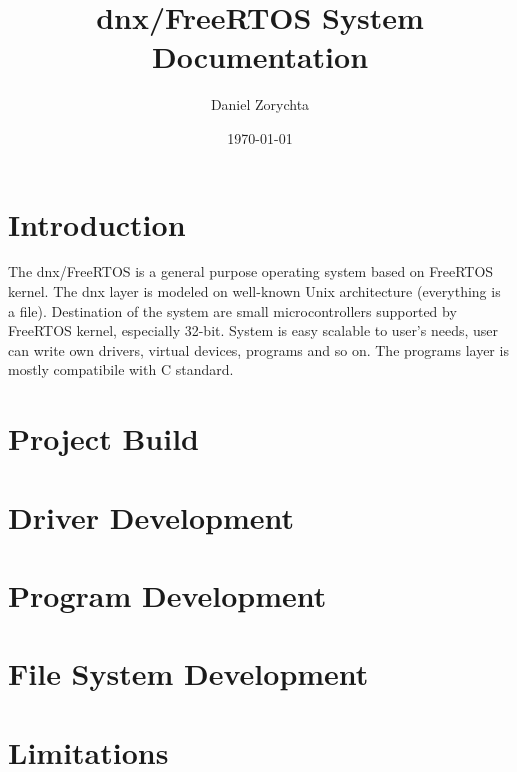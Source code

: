 \documentclass[a4paper,11pt]{article}
\title{dnx/FreeRTOS System Documentation}
\author{Daniel Zorychta}
\date{\today}
\begin{document}
\maketitle
\tableofcontents

\section{Introduction}
The dnx/FreeRTOS is a general purpose operating system based on FreeRTOS kernel.
The dnx layer is modeled on well-known Unix architecture (everything is a file).
Destination  of  the  system  are  small  microcontrollers supported by FreeRTOS
kernel,  especially  32-bit.  System  is easy scalable to user's needs, user can
write own drivers,  virtual devices,  programs and so on.  The programs layer is
mostly compatibile with C standard.

\section{Project Build}

\section{Driver Development}

\section{Program Development}

\section{File System Development}

\section{Limitations}
\end{document}
